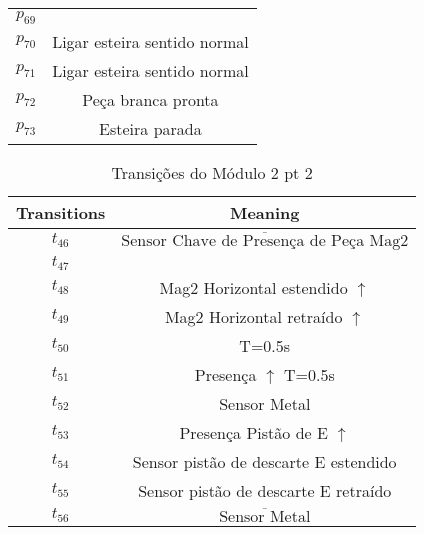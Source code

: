 \begin{table}[htbp]
\begin{tabular}{c|c}
\hyperlink{partialNet:p69}{\hypertarget{partialTable:p69}{$p_{69}$}} & \\
\hyperlink{partialNet:p70}{\hypertarget{partialTable:p70}{$p_{70}$}} & Ligar esteira sentido normal\\
\hyperlink{partialNet:p71}{\hypertarget{partialTable:p71}{$p_{71}$}} & Ligar esteira sentido normal\\
\hyperlink{partialNet:p72}{\hypertarget{partialTable:p72}{$p_{72}$}} & Peça branca pronta\\
\hyperlink{partialNet:p73}{\hypertarget{partialTable:p73}{$p_{73}$}} & Esteira parada\\
\end{tabular}
\end{table}

\begin{table}[htbp]
\caption{Transições do Módulo 2 pt 2}
\centering
\begin{tabular}{c|c}
Transitions & Meaning\\
\hline
\hyperlink{partialNet:t46}{\hypertarget{partialTable:t46}{$t_{46}$}} & \(\overline{\mbox{Sensor Chave de Presença de Peça Mag2}}\)\\
\hyperlink{partialNet:t47}{\hypertarget{partialTable:t47}{$t_{47}$}} & \\
\hyperlink{partialNet:t48}{\hypertarget{partialTable:t48}{$t_{48}$}} & Mag2 Horizontal estendido \(\uparrow\)\\
\hyperlink{partialNet:t49}{\hypertarget{partialTable:t49}{$t_{49}$}} & Mag2 Horizontal retraído \(\uparrow\)\\
\hyperlink{partialNet:tt50}{\hypertarget{partialTable:tt50}{$t_{50}$}} & T=0.5s\\
\hyperlink{partialNet:tt51}{\hypertarget{partialTable:tt51}{$t_{51}$}} & Presença \(\uparrow\) T=0.5s\\
\hyperlink{partialNet:t52}{\hypertarget{partialTable:t52}{$t_{52}$}} & Sensor Metal\\
\hyperlink{partialNet:t53}{\hypertarget{partialTable:t53}{$t_{53}$}} & Presença Pistão de E \(\uparrow\)\\
\hyperlink{partialNet:t54}{\hypertarget{partialTable:t54}{$t_{54}$}} & Sensor pistão de descarte E estendido\\
\hyperlink{partialNet:t55}{\hypertarget{partialTable:t55}{$t_{55}$}} & Sensor pistão de descarte E retraído\\
\hyperlink{partialNet:t56}{\hypertarget{partialTable:t56}{$t_{56}$}} & \(\overline{\mbox{Sensor Metal}}\)\\

\end{tabular}
\end{table}
